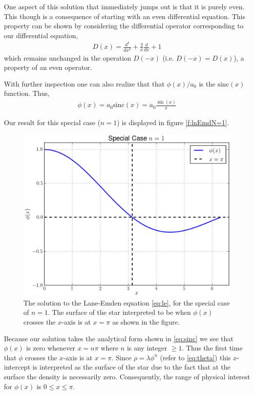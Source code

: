 \documentclass[12pt, manuscript]{article}
\begin{document}
\noindent One aspect of this solution that immediately jumps out is that it is purely even. This though is a consequence of starting with an even differential equation. This property can be shown by considering the differential operator corresponding to our differential equation,
\begin{align}
D(x) = \frac{d^{2}}{dx^{2}}+\frac{2}{x}\frac{d}{dx}+1
\end{align}
\noindent which remains unchanged in the operation $D(-x)$ (i.e. $D(-x)=D(x)$), a property of an even operator.

\noindent With further inspection one can also realize that that $\phi(x)/a_{0}$ is the $\text{sinc}(x)$ function. Thus,
\begin{align}
\phi(x) =a_{0}\text{sinc}(x) = a_{0}\frac{\sin(x)}{x}\label{eq:sinc}
\end{align}

\noindent Our result for this special case ($n=1$) is displayed in figure \eqref{f:lnEmdN=1}.

\begin{figure}[h]
  \begin{center}
      \includegraphics[scale=0.7]{images/LanEmdNeq1.eps}
  \caption{The solution to the Lane-Emden equation \eqref{eq:le}, for the special case of $n=1$. The surface of the star interpreted to be when $\phi(x)$ crosses the $x$-axis is at $x=\pi$ as shown in the figure.}\label{f:lnEmdN=1}
\end{center}
\end{figure}

\noindent Because our solution takes the analytical form shown in \eqref{eq:sinc} we see that $\phi(x)$ is zero whenever $x=n\pi$ where $n$ is any integer $\ge 1$. Thus the first time that $\phi$ crosses the $x$-axis is at $x=\pi$. Since $\rho = \lambda\phi^{n}$ (refer to \eqref{eq:theta})  this $x$-intercept is interpreted as the surface of the star due to the fact that at the surface the density is necessarily zero. Consequently, the range of physical interest for $\phi(x)$ is $0\le x\le\pi$.
\end{document}

